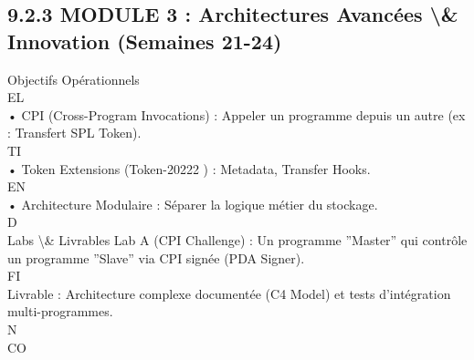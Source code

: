 \documentclass[12pt,landscape,a4paper]{article}
\begin{document}
\subsection{9.2.3 MODULE 3 : Architectures Avancées \textbackslash{}& Innovation (Semaines 21-24)}
Objectifs Opérationnels\\
\vspace{0.5em}
\vspace{0.5em}
\vspace{0.5em}
\vspace{0.5em}
EL\\
• CPI (Cross-Program Invocations) : Appeler un programme depuis un autre (ex : Transfert SPL Token).\\
\vspace{0.5em}
\vspace{0.5em}
\vspace{0.5em}
\vspace{0.5em}
TI\\
• Token Extensions (Token-20222 ) : Metadata, Transfer Hooks.\\
\vspace{0.5em}
\vspace{0.5em}
\vspace{0.5em}
\vspace{0.5em}
EN\\
• Architecture Modulaire : Séparer la logique métier du stockage.\\
\vspace{0.5em}
\vspace{0.5em}
\vspace{0.5em}
\vspace{0.5em}
D\\
Labs \textbackslash{}& Livrables Lab A (CPI Challenge) : Un programme ”Master” qui contrôle un programme ”Slave” via CPI signée (PDA Signer).\\
\vspace{0.5em}
\vspace{0.5em}
\vspace{0.5em}
\vspace{0.5em}
FI\\
Livrable : Architecture complexe documentée (C4 Model) et tests d’intégration multi-programmes.\\
\vspace{0.5em}
N\\
CO\\
\end{document}

